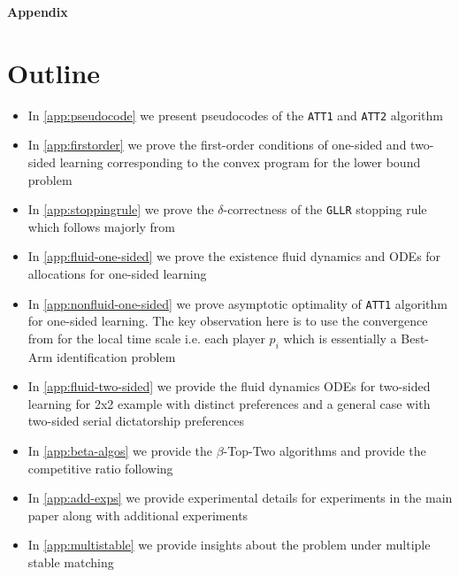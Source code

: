 \documentclass{article}
\begin{document}


\clearpage



\clearpage
\appendix
\begin{center}
    {\Large{\textbf{Appendix}}}
\end{center}

\section{Outline}
\begin{itemize}
    \item In \ref{app:pseudocode} we present pseudocodes of the \texttt{ATT1} and \texttt{ATT2} algorithm 
    \item In \ref{app:firstorder} we prove the first-order conditions of one-sided and two-sided learning corresponding to the convex program for the lower bound problem
    \item In \ref{app:stoppingrule} we prove the $\delta$-correctness of the \texttt{GLLR} stopping rule which follows majorly from \cite{kaufmann2020contributions}
    \item In \ref{app:fluid-one-sided} we prove the existence fluid dynamics and ODEs for allocations for one-sided learning
    \item In \ref{app:nonfluid-one-sided} we prove asymptotic optimality of \texttt{ATT1} algorithm for one-sided learning. The key observation here is to use the convergence from \cite{bandyopadhyay2024optimal} for the local time scale i.e. each player $p_i$ which is essentially a Best-Arm identification problem
    \item In \ref{app:fluid-two-sided} we provide the fluid dynamics ODEs for two-sided learning for 2x2 example with distinct preferences and a general case with two-sided serial dictatorship preferences
    \item In \ref{app:beta-algos} we provide the $\beta$-Top-Two algorithms and provide the competitive ratio following \cite{russo2020simple}
    \item In \ref{app:add-exps} we provide experimental details for experiments in the main paper along with additional experiments 
    \item In \ref{app:multistable} we provide insights about the problem under multiple stable matching
\end{itemize}
\end{document}
